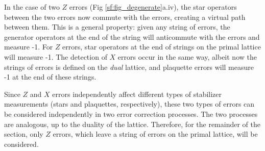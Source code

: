 In the case of two $Z$ errors (Fig \ref{sf:fig_degenerate}a.iv), the star operators between the two errors now commute with the errors, creating a virtual path between them. This is a general property: given any string of errors, the generator operators at the end of the string will anticommute with the errors and measure -1. For $Z$ errors, star operators at the end of strings on the primal lattice will measure -1. The detection of $X$ errors occur in the same way, albeit now the strings of errors is defined on the \emph{dual} lattice, and plaquette errors will measure -1 at the end of these strings.

Since $Z$ and $X$ errors independently affect different types of stabilizer measurements (stars and plaquettes, respectively), these two types of errors can be considered independently in two error correction processes. The two processes are analogous, up to the duality of the lattice. Therefore, for the remainder of the section, only $Z$ errors, which leave a string of errors on the primal lattice, will be considered.

